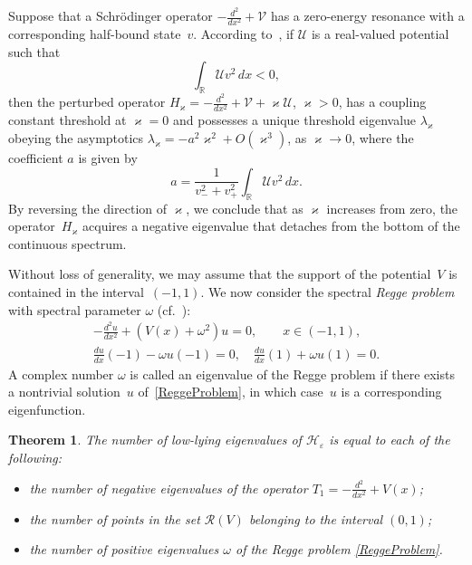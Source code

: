 \documentclass[reqno]{amsart}
\newtheorem{thm}{Theorem}
\theoremstyle{definition}
\theoremstyle{remark}
\numberwithin{equation}{section}
\renewcommand{\kappa}{\varkappa}
\newcommand{\Real}{\mathbb R}
\newcommand{\eps}{\varepsilon}
\newcommand{\cH}{\mathcal{H}}
\newcommand{\cV}{\mathcal{V}}
\newcommand{\cU}{\mathcal{U}}
\newcommand{\cR}{\mathcal{R}}
\begin{document}
Suppose that a Schr\"odinger operator $-\frac{d^2}{dx^2}+\cV$ has a zero-energy resonance with a corresponding half-bound state~$v$. According to~\cite[Th.~3.2]{Klaus1982}, if $\cU$ is a real-valued potential such that
\begin{equation*}
  \int_\Real \cU v^2\,dx<0,
\end{equation*}
then the perturbed operator  $H_\kappa=-\frac{d^2}{dx^2}+\cV+\kappa \cU$, $\kappa> 0$, has a coupling constant threshold at $\kappa=0$ and possesses a unique threshold eigenvalue $\lambda_\kappa$ obeying the asymptotics $\lambda_\kappa=-a^2\kappa^2+O(\kappa^3)$, as $\kappa\to 0$, where the coefficient $a$ is given by
\begin{equation}\label{AinAsymptotics}
  a=\frac1{v_-^2+v_+^2}\int_\Real \cU v^2\,dx.
\end{equation}
By reversing the direction of $\kappa$, we conclude that as $\kappa$ increases from zero, the operator~$H_\kappa$ acquires a negative eigenvalue that detaches from the bottom of the continuous spectrum.

Without loss of generality, we may assume that the support of the potential~$V$ is contained in the interval~$(-1,1)$. We now consider the spectral \textit{Regge problem} with spectral parameter $\omega$ (cf.~\cite{Shkalikov2007}):
\begin{equation}\label{ReggeProblem}
\begin{gathered}
   -\frac{d^2 u}{dx^2}+(V(x)+\omega^2)u=0, \qquad x\in(-1,1),
  \\
  \frac{d u}{dx}(-1)-\omega u(-1)=0,\quad \frac{d u}{dx}(1)+\omega u(1)=0.
\end{gathered}
\end{equation}
A complex number $\omega$ is called an eigenvalue of the Regge problem if there exists a nontrivial solution~$u$ of~\eqref{ReggeProblem}, in which case~$u$ is a corresponding eigenfunction.



%
\begin{thm}\label{thmNumberLLE}
The number of low-lying eigenvalues  of $\cH_\eps$ is equal to each of the following:
  \begin{itemize}
    \item[\textit{(i)}] the number of negative eigenvalues of the operator $T_1=-\frac{d^2}{dx^2}+V(x)$;
    \item[\textit{(ii)}] the number of points in the set $\cR(V)$ belonging to the interval $(0,1)$;
    \item[\textit{(iii)}] the number of positive eigenvalues $\omega$ of the Regge problem \eqref{ReggeProblem}.
  \end{itemize}
\end{thm}
%
\end{document}
